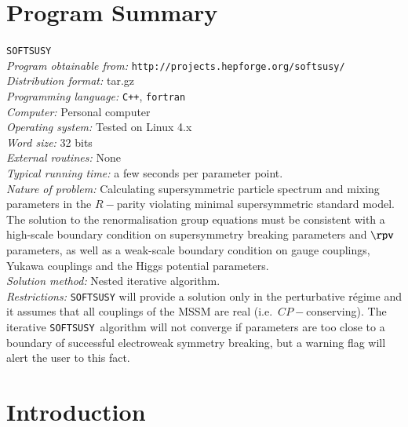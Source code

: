 \documentclass[final,3p,times,pdflatex]{elsarticle}
\def\SOFTSUSY{{\tt SOFTSUSY}}
\begin{document}
\section{Program Summary}
 \SOFTSUSY{}\\
{\em Program obtainable
  from:} {\tt http://projects.hepforge.org/softsusy/}\\
{\em Distribution format:}\/ tar.gz\\
{\em Programming language:} {\tt C++}, {\tt fortran}\\
{\em Computer:}\/ Personal computer\\
{\em Operating system:}\/ Tested on Linux 4.x\\
{\em Word size:}\/ 32 bits\\
{\em External routines:}\/ None\\
{\em Typical running time:}\/ a few seconds per parameter point.\\
{\em Nature of problem:}\/ Calculating supersymmetric particle spectrum and
mixing parameters in the $R-$parity violating minimal supersymmetric standard
model. The solution to the renormalisation group equations must be consistent
with a high-scale boundary condition on supersymmetry breaking parameters and
$\rpv$ parameters, as well as a weak-scale boundary condition on gauge
couplings, Yukawa couplings and the Higgs potential parameters.\\
{\em Solution method:}\/ Nested iterative algorithm. \\
{\em Restrictions:} {\SOFTSUSY} will provide a solution only in the
perturbative r\'{e}gime and it
assumes that all couplings of the MSSM are real
(i.e.\ $CP-$conserving). The iterative \SOFTSUSY~algorithm will not 
converge if parameters are too close to a boundary of successful electroweak
symmetry breaking, but a warning flag will alert the user to this fact.

\newpage

\section{Introduction}
\end{document}
